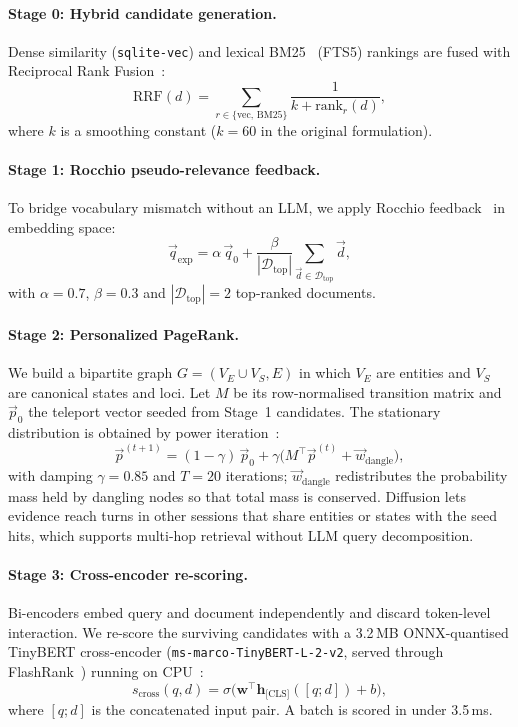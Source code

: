 \documentclass[11pt]{article}
\newcommand{\vq}{\vec{q}}
\newcommand{\vp}{\vec{p}}
\begin{document}
\paragraph{Stage 0: Hybrid candidate generation.}
Dense similarity (\texttt{sqlite-vec}) and lexical BM25~\cite{robertson2009bm25} (FTS5) rankings are fused with Reciprocal Rank Fusion~\cite{cormack2009rrf}:
\begin{equation}
  \mathrm{RRF}(d)=\sum_{r\in\{\text{vec},\,\text{BM25}\}}\frac{1}{k+\mathrm{rank}_r(d)},
\end{equation}
where $k$ is a smoothing constant ($k=60$ in the original formulation).

\paragraph{Stage 1: Rocchio pseudo-relevance feedback.}
To bridge vocabulary mismatch without an LLM, we apply Rocchio feedback~\cite{rocchio1971relevance} in embedding space:
\begin{equation}
  \vq_{\text{exp}}=\alpha\,\vq_0+\frac{\beta}{|\mathcal{D}_{\text{top}}|}\sum_{\vec d\in\mathcal{D}_{\text{top}}}\vec d,
  \label{eq:rocchio}
\end{equation}
with $\alpha=0.7$, $\beta=0.3$ and $|\mathcal{D}_{\text{top}}|=2$ top-ranked documents.

\paragraph{Stage 2: Personalized PageRank.}
We build a bipartite graph $G=(V_E\cup V_S,E)$ in which $V_E$ are entities and $V_S$ are canonical states and loci. Let $M$ be its row-normalised transition matrix and $\vp_0$ the teleport vector seeded from Stage~1 candidates. The stationary distribution is obtained by power iteration~\cite{page1999pagerank}:
\begin{equation}
  \vp^{(t+1)}=(1-\gamma)\,\vp_0+\gamma\big(M^{\top}\vp^{(t)}+\vec w_{\text{dangle}}\big),
  \label{eq:ppr}
\end{equation}
with damping $\gamma=0.85$ and $T=20$ iterations; $\vec w_{\text{dangle}}$ redistributes the probability mass held by dangling nodes so that total mass is conserved. Diffusion lets evidence reach turns in other sessions that share entities or states with the seed hits, which supports multi-hop retrieval without LLM query decomposition.

\paragraph{Stage 3: Cross-encoder re-scoring.}
Bi-encoders embed query and document independently and discard token-level interaction. We re-score the surviving candidates with a 3.2\,MB ONNX-quantised TinyBERT cross-encoder (\texttt{ms-marco-TinyBERT-L-2-v2}, served through FlashRank~\cite{flashrank}) running on CPU~\cite{jiao2020tinybert,nogueira2019passage}:
\begin{equation}
  s_{\text{cross}}(q,d)=\sigma\!\big(\mathbf{w}^{\top}\mathbf{h}_{\text{[CLS]}}([q;d])+b\big),
  \label{eq:cross}
\end{equation}
where $[q;d]$ is the concatenated input pair. A batch is scored in under 3.5\,ms.
\end{document}

